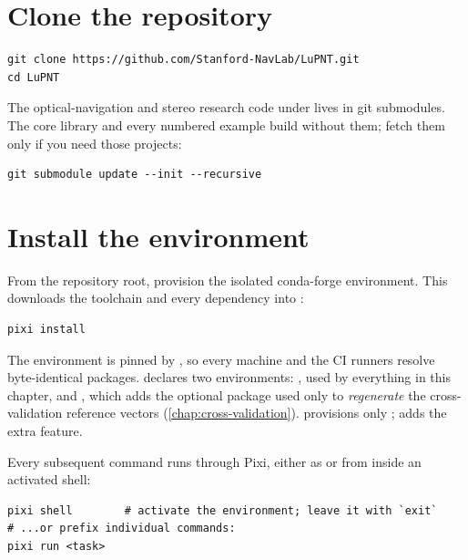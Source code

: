 \section{Clone the repository}
\label{sec:gs-clone}

\begin{lstlisting}[language=shell]
git clone https://github.com/Stanford-NavLab/LuPNT.git
cd LuPNT
\end{lstlisting}

\begin{lupntnote}
The optical-navigation and stereo research code under
 lives in git submodules. The core library and every
numbered example build without them; fetch them only if you need those
projects:

\begin{lstlisting}[language=shell]
git submodule update --init --recursive
\end{lstlisting}
\end{lupntnote}

\section{Install the environment}
\label{sec:gs-install}

From the repository root, provision the isolated conda-forge environment. This
downloads the toolchain and every dependency into :

\begin{lstlisting}[language=shell]
pixi install
\end{lstlisting}

The environment is pinned by , so every machine and the CI
runners resolve byte-identical packages.  declares two
environments: , used by everything in this chapter, and
, which adds the optional  package used only to
\emph{regenerate} the cross-validation reference vectors
(\cref{chap:cross-validation}).  provisions only
;  adds the extra feature.

Every subsequent command runs through Pixi, either as  or
from inside an activated shell:

\begin{lstlisting}[language=shell]
pixi shell        # activate the environment; leave it with `exit`
# ...or prefix individual commands:
pixi run <task>
\end{lstlisting}

